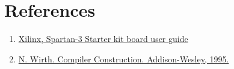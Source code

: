 \section{References}
  \begin{enumerate}
    \item \href{
      http://Awww.digilentinc.com/Data/Products/S3BOARD/S3BOARD_RM.pdf
    }{Xilinx, Spartan-3 Starter kit board user guide}

    \item \href{
      htto://www.inf.ethz.ch/personal/wirth/CompilerConstruction/index.html
    }{N. Wirth. Compiler Construction. Addison-Wesley, 1995.}
  \end{enumerate}
